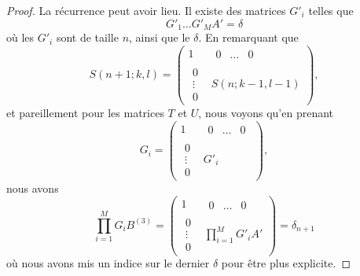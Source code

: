 \begin{proof}
	La récurrence peut avoir lieu. Il existe des matrices \( G'_i\) telles que
	\begin{equation}
		G'_1\ldots G'_MA'=\delta
	\end{equation}
	où les \( G'_i\) sont de taille \( n\), ainsi que le \( \delta\). En remarquant que
	\begin{equation}
		S(n+1;k,l) =\begin{pmatrix}
			1              & \begin{matrix}
				                 0 & \ldots & 0
			                 \end{matrix} \\
			\begin{matrix}
				0      \\
				\vdots \\
				0
			\end{matrix} & S(n;k-1,l-1)
		\end{pmatrix},
	\end{equation}
	et pareillement pour les matrices \( T\) et \( U\), nous voyons qu'en prenant
	\begin{equation}
		G_i =\begin{pmatrix}
			1              & \begin{matrix}
				                 0 & \ldots & 0
			                 \end{matrix} \\
			\begin{matrix}
				0      \\
				\vdots \\
				0
			\end{matrix} & G'_i
		\end{pmatrix},
	\end{equation}
	nous avons
	\begin{equation}
		\prod_{i=1}^MG_iB^{(3)}=
		\begin{pmatrix}
			1              & \begin{matrix}
				                 0 & \ldots & 0
			                 \end{matrix}    \\
			\begin{matrix}
				0      \\
				\vdots \\
				0
			\end{matrix} & \prod_{i=1}^MG'_iA'
		\end{pmatrix}=\delta_{n+1}
	\end{equation}
	où nous avons mis un indice sur le dernier \( \delta\) pour être plus explicite.
\end{proof}

